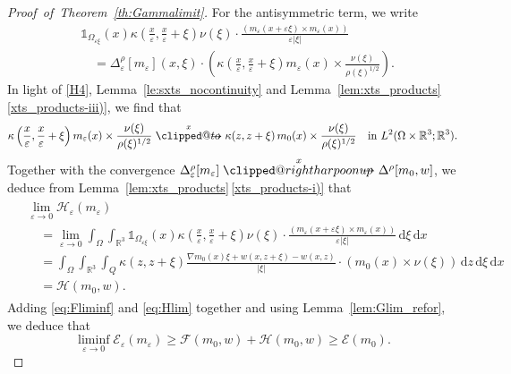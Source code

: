 \documentclass[reqno,11pt]{amsart}
\makeatletter
\numberwithin{equation}{section}
\theoremstyle{thmlemcorr}
\numberwithin{theorem}{section}
\theoremstyle{thmlemcorr*}
\theoremstyle{defi}
\theoremstyle{remexample}
\theoremstyle{ass}
\newcommand{\R}{\mathbb{R}}
\newcommand{\Ecal}{\mathcal{E}}
\newcommand{\Hcal}{\mathcal{H}}
\renewcommand{\epsilon}{\varepsilon}
\newcommand{\dd}{\,\mathrm{d}}
\newcommand{\1}{\mathds{1}}
\DeclareRobustCommand{\wtwoscale}{%
  \clippedrightharpoonup\mathrel{\mspace{-15mu}}\rightharpoonup
}
\newcommand{\clippedrightharpoonup}{%
  \mathrel{\mathpalette\clipped@rightharpoonup\relax}%
}
\newcommand{\clipped@rightharpoonup}[2]{%
  \sbox\z@{$\m@th#1\mspace{6mu}$}%
  \clipbox{0pt 0pt {\dimexpr\width-.5\wd\z@} 0pt}{$\m@th#1\rightharpoonup$}%
  \smash{\clipbox{{\wd\z@} 0pt 0pt {-\width}}{$\m@th#1\rightharpoonup$}}%
}
\DeclareRobustCommand{\twoscale}{%
  \clippedto\mathrel{\mspace{-15mu}}\to
}
\newcommand{\clippedto}{%
  \mathrel{\mathpalette\clipped@to\relax}%
}
\newcommand{\clipped@to}[2]{%
  \sbox\z@{$\m@th#1\mspace{6mu}$}%
  \clipbox{0pt 0pt {\dimexpr\width-.5\wd\z@} 0pt}{$\m@th#1\to$}%
  \smash{\clipbox{{\wd\z@} 0pt 0pt {-\width}}{$\m@th#1\to$}}%
}
\newcommand{\xtwoscale}{\overset{x}{\twoscale}}
\newcommand{\wxtwoscale}{\overset{x}{\wtwoscale}}
\makeatother
\begin{document}
\begin{proof}[Proof~of~Theorem~\ref{th:Gammalimit}]
For the antisymmetric term, we write
\begin{align*}
    &\1_{\Omega_{\epsilon\xi}}(x)\kappa\left(\frac{x}{\epsilon},\frac{x}{\epsilon}+\xi\right)\nu(\xi)\cdot\frac{(m_\epsilon(x+\epsilon\xi)\times m_\epsilon(x))}{\epsilon|\xi|}\\
   &\quad=\Delta^\rho_\epsilon[m_\epsilon](x,\xi)\cdot \left(\kappa\left(\frac{x}{\epsilon},\frac{x}{\epsilon}+\xi\right)m_\epsilon(x) \times \frac{\nu(\xi)}{\rho(\xi)^{1/2}}\right).
\end{align*}
In light of \ref{H4}, Lemma~\ref{le:sxts_nocontinuity} and Lemma~\ref{lem:xts_products}\,\ref{xts_products-iii)}, we find that 
\[
\kappa\left(\frac{x}{\epsilon},\frac{x}{\epsilon}+\xi\right)m_\epsilon(x) \times \frac{\nu(\xi)}{\rho(\xi)^{1/2}}\xtwoscale
\kappa(z,z+\xi) \,m_0(x) \times \frac{\nu(\xi)}{\rho(\xi)^{1/2}} \quad \text{in $L^2(\Omega\times\R^3;\R^3)$}.
\]
 Together with the convergence $\Delta^\rho_\epsilon [m_\epsilon] \wxtwoscale \Delta^\rho[m_0,w]$, we deduce from Lemma~\ref{lem:xts_products}\,\ref{xts_products-i)} that
\begin{align}
\begin{split}\label{eq:Hlim}
    &\lim_{\epsilon \to 0}\Hcal_\epsilon(m_\epsilon) \\
    &\quad= \lim_{\epsilon \to 0} \int_{\Omega}\int_{\R^3} \1_{\Omega_{\epsilon\xi}}(x)\kappa\left(\frac{x}{\epsilon},\frac{x}{\epsilon}+\xi\right)\nu(\xi)\cdot\frac{(m_\epsilon(x+\epsilon\xi)\times m_\epsilon(x))}{\epsilon|\xi|}\dd \xi\dd x \\
    &\quad=\int_{\Omega}\int_{\R^3}\int_{Q} \kappa(z,z+\xi)\frac{\nabla m_0(x)\xi+w(x,z+\xi)-w(x,z)}{|\xi|}\cdot(m_0(x)\times \nu(\xi)) \dd z \dd \xi \dd x\\
    &\quad= \Hcal(m_0,w).
\end{split}
\end{align}
Adding \eqref{eq:Fliminf} and \eqref{eq:Hlim} together and using Lemma~\ref{lem:Glim_refor}, we deduce that
\[
\liminf_{\epsilon \to 0} \Ecal_\epsilon(m_\epsilon) 
\geq 
    \mathcal{F}(m_0,w) + \mathcal{H}(m_0,w)
\geq\Ecal(m_0).
\]
\smallskip


\end{proof}
\end{document}

